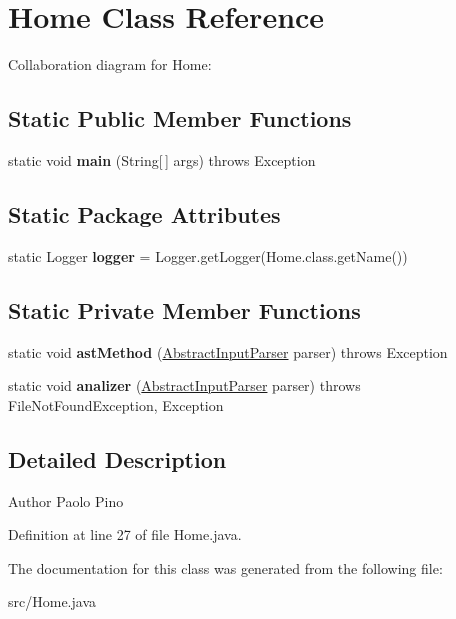 \hypertarget{class_home}{\section{Home Class Reference}
\label{class_home}
}


Collaboration diagram for Home\-:
\subsection*{Static Public Member Functions}
\begin{DoxyCompactItemize}
\item 
\hypertarget{class_home_a824a2d585cb36f1a452ebc5db9b49ed0}{static void {\bfseries main} (String\mbox{[}$\,$\mbox{]} args)  throws Exception}\label{class_home_a824a2d585cb36f1a452ebc5db9b49ed0}

\end{DoxyCompactItemize}
\subsection*{Static Package Attributes}
\begin{DoxyCompactItemize}
\item 
\hypertarget{class_home_ac74d97ae59ddf53153a62e8790619756}{static Logger {\bfseries logger} = Logger.\-get\-Logger(Home.\-class.\-get\-Name())}\label{class_home_ac74d97ae59ddf53153a62e8790619756}

\end{DoxyCompactItemize}
\subsection*{Static Private Member Functions}
\begin{DoxyCompactItemize}
\item 
\hypertarget{class_home_ac6c6a408dc24c30d02945cd67403d6d1}{static void {\bfseries ast\-Method} (\hyperlink{classinput_parser_1_1_abstract_input_parser}{Abstract\-Input\-Parser} parser)  throws Exception }\label{class_home_ac6c6a408dc24c30d02945cd67403d6d1}

\item 
\hypertarget{class_home_a207d973f0026822784672e07478745aa}{static void {\bfseries analizer} (\hyperlink{classinput_parser_1_1_abstract_input_parser}{Abstract\-Input\-Parser} parser)  throws File\-Not\-Found\-Exception, Exception }\label{class_home_a207d973f0026822784672e07478745aa}

\end{DoxyCompactItemize}


\subsection{Detailed Description}
\begin{DoxyAuthor}{Author}
Paolo Pino 
\end{DoxyAuthor}


Definition at line 27 of file Home.\-java.



The documentation for this class was generated from the following file\-:\begin{DoxyCompactItemize}
\item 
src/Home.\-java\end{DoxyCompactItemize}

